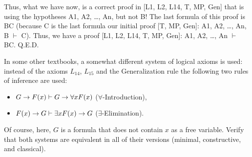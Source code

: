 Thus, what we have now, is a correct proof in [L1, L2, L14, T, MP, Gen] that is using the hypotheses A1,
A2, \ldots , An, but not B! The last formula of this proof is B\IMPLIES C (because C is the last formula our initial
proof [T, MP, Gen]: A1, A2, \ldots , An, B \(\vdash\) C). Thus, we have a proof [L1, L2, L14, T, MP, Gen]: A1, A2, \ldots ,
An \(\vdash\) B\IMPLIES C. Q.E.D.

\begin{exer}
In some other textbooks, a somewhat different system of logical axioms is used: instead of the axioms \(L_{14}\), \(L_{15}\) and the Generalization rule the following two rules of inference are used:
\begin{itemize}
    \item \(G\rightarrow F(x) \vdash G\rightarrow \forall xF(x)\) (\(\forall\)-Introduction),
    \item \(F(x)\rightarrow G \vdash \exists xF(x)\rightarrow G\) (\(\exists\)-Elimination).
\end{itemize}
Of course, here, \(G\) is a formula that does not contain \(x\) as a free variable. Verify that both systems are
equivalent in all of their versions (minimal, constructive, and classical).
\end{exer}

